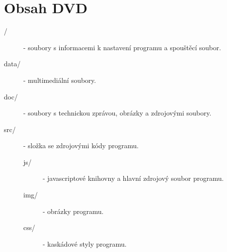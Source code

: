 






\chapter{Obsah DVD} %

\begin{description}
	\item[/] - soubory s informacemi k nastavení programu a spouštěcí soubor.
	\item[data/] - multimediální soubory.	
	\item[doc/] - soubory s technickou zprávou, obrázky a zdrojovými soubory.	
	\item[src/] - složka se zdrojovými kódy programu.	
		\begin{description}
			\item[js/] - javascriptové knihovny a hlavní zdrojový soubor programu.
			\item[img/] - obrázky programu.
			\item[css/] - kaskádové styly programu.
		\end{description}
\end{description}


